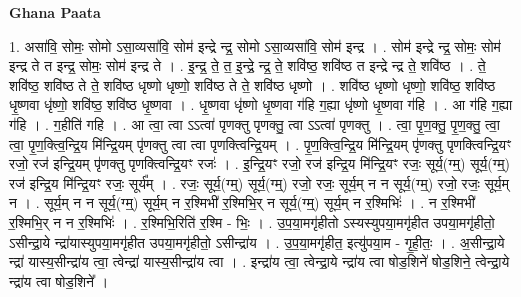 \documentclass[17pt]{extarticle}
\begin{document}
\textbf{Ghana Paata } \newline

1. असा॑वि॒ सोमः॒ सोमो ऽसा॒व्यसा॑वि॒ सोम॑ इन्द्रे न्द्र॒ सोमो ऽसा॒व्यसा॑वि॒ सोम॑ इन्द्र । . सोम॑ इन्द्रे न्द्र॒ सोमः॒ सोम॑ इन्द्र ते त इन्द्र॒ सोमः॒ सोम॑ इन्द्र ते । . इ॒न्द्र॒ ते॒ त॒ इ॒न्द्रे॒ न्द्र॒ ते॒ शवि॑ष्ठ॒ शवि॑ष्ठ त इन्द्रे न्द्र ते॒ शवि॑ष्ठ । . ते॒ शवि॑ष्ठ॒ शवि॑ष्ठ ते ते॒ शवि॑ष्ठ धृष्णो धृष्णो॒ शवि॑ष्ठ ते ते॒ शवि॑ष्ठ धृष्णो । . शवि॑ष्ठ धृष्णो धृष्णो॒ शवि॑ष्ठ॒ शवि॑ष्ठ धृ॒ष्णवा धृ॑ष्णो॒ शवि॑ष्ठ॒ शवि॑ष्ठ धृ॒ष्णवा । . धृ॒ष्णवा धृ॑ष्णो धृ॒ष्णवा ग॑हि ग॒ह्या धृ॑ष्णो धृ॒ष्णवा ग॑हि । . आ ग॑हि ग॒ह्या ग॑हि । . ग॒हीति॑ गहि । . आ त्वा॒ त्वा ऽऽत्वा॑ पृणक्तु पृणक्तु॒ त्वा ऽऽत्वा॑ पृणक्तु । . त्वा॒ पृ॒ण॒क्तु॒ पृ॒ण॒क्तु॒ त्वा॒ त्वा॒ पृ॒ण॒क्त्वि॒न्द्रि॒य मि॑न्द्रि॒यम् पृ॑णक्तु त्वा त्वा पृणक्त्विन्द्रि॒यम् । . पृ॒ण॒क्त्वि॒न्द्रि॒य मि॑न्द्रि॒यम् पृ॑णक्तु पृणक्त्विन्द्रि॒यꣳ रजो॒ रज॑ इन्द्रि॒यम् पृ॑णक्तु पृणक्त्विन्द्रि॒यꣳ रजः॑ । . इ॒न्द्रि॒यꣳ रजो॒ रज॑ इन्द्रि॒य मि॑न्द्रि॒यꣳ रजः॒ सूर्य॒(ग्म्॒) सूर्य॒(ग्म्॒) रज॑ इन्द्रि॒य मि॑न्द्रि॒यꣳ रजः॒ सूर्य᳚म् । . रजः॒ सूर्य॒(ग्म्॒) सूर्य॒(ग्म्॒) रजो॒ रजः॒ सूर्य॒म् न न सूर्य॒(ग्म्॒) रजो॒ रजः॒ सूर्य॒म् न । . सूर्य॒म् न न सूर्य॒(ग्म्॒) सूर्य॒म् न र॒श्मिभी॑ र॒श्मिभि॒र् न सूर्य॒(ग्म्॒) सूर्य॒म् न र॒श्मिभिः॑ । . न र॒श्मिभी॑ र॒श्मिभि॒र् न न र॒श्मिभिः॑ । . र॒श्मिभि॒रिति॑ र॒श्मि - भिः॒ । . उ॒प॒या॒मगृ॑हीतो ऽस्यस्युपया॒मगृ॑हीत उपया॒मगृ॑हीतो॒ ऽसीन्द्रा॒ये न्द्रा॑यास्युपया॒मगृ॑हीत उपया॒मगृ॑हीतो॒ ऽसीन्द्रा॑य । . उ॒प॒या॒मगृ॑हीत॒ इत्यु॑पया॒म - गृ॒ही॒तः॒ । . अ॒सीन्द्रा॒ये न्द्रा॑ यास्य॒सीन्द्रा॑य त्वा॒ त्वेन्द्रा॑ यास्य॒सीन्द्रा॑य त्वा । . इन्द्रा॑य त्वा॒ त्वेन्द्रा॒ये न्द्रा॑य त्वा षोड॒शिने॑ षोड॒शिने॒ त्वेन्द्रा॒ये न्द्रा॑य त्वा षोड॒शिने᳚ । \newline
\end{document}
